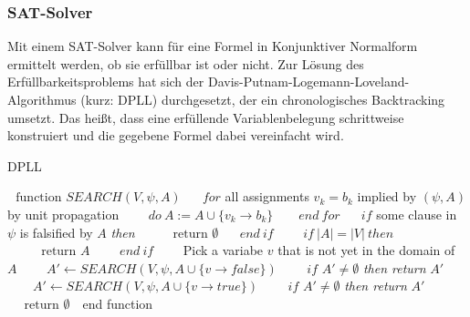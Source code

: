 \documentclass[a4,abstract=on]{scrartcl}
\begin{document}
\subsubsection{SAT-Solver}
Mit einem SAT-Solver kann für eine Formel in Konjunktiver Normalform ermittelt werden, ob sie erfüllbar ist oder nicht. Zur Lösung des Erfüllbarkeitsproblems hat sich der Davis-Putnam-Logemann-Loveland-Algorithmus (kurz: DPLL) durchgesetzt, der ein chronologisches Backtracking umsetzt. Das heißt, dass eine erfüllende Variablenbelegung schrittweise konstruiert und die gegebene Formel dabei vereinfacht wird. 
\begin{algorithm}
\caption{DPLL}
\label{alg:dpll}
\begin{algorithmic}

\State $\text{~~function~}SEARCH(V,\psi,A) $
\State $\text{~~~~}for$ all assignments $v_k=b_k$ implied by $(\psi, A)$ by unit propagation 
\State $\text{~~~~~~}do {~}A:=A\cup\{v_k \rightarrow b_k\}$
\State $\text{~~~~ }end {~} for$
\State $\text{~~~~}if $ some clause in $\psi$ is falsified by $A$ \textit{then}
\State $\text{~~~~~~~~return } \emptyset$
\State $\text{~~~~}end {~} if$
\State $\text{~~~~~~}if {~} |A| = |V| {~} then$
\State $\text{~~~~~~~~return } A$
\State $\text{~~~~~~} end {~} if$
\State $\text{~~~~~~}$Pick a variabe $v$ that is not yet in the domain of $A$
\State $\text{~~~~~~} A' \leftarrow SEARCH(V,\psi,A\cup\{v \rightarrow false\})$
\State $\text{~~~~~~}if$ $A' \neq \emptyset$ \textit{then return} $A'$
\State $\text{~~~~~~}A' \leftarrow SEARCH(V,\psi, A \cup \{v \rightarrow true\})$
\State $\text{~~~~~~}if$ $A' \neq \emptyset$ \textit{then return} $A'$
\State $\text{~~~~return }\emptyset$
\State $\text{~~}$end function
\end{algorithmic}
\end{algorithm}
\end{document}
